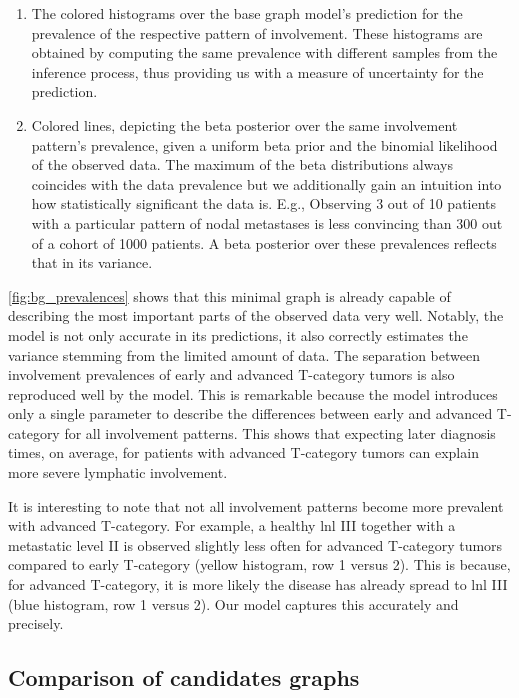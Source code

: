 \documentclass[twocolumn]{aastex631}
\begin{document}
\begin{enumerate}
    \item The colored histograms over the base graph model's prediction for the prevalence of the respective pattern of involvement. These histograms are obtained by computing the same prevalence with different samples from the inference process, thus providing us with a measure of uncertainty for the prediction.
    \item Colored lines, depicting the beta posterior over the same involvement pattern's prevalence, given a uniform beta prior and the binomial likelihood of the observed data. The maximum of the beta distributions always coincides with the data prevalence but we additionally gain an intuition into how statistically significant the data is. E.g., Observing 3 out of 10 patients with a particular pattern of nodal metastases is less convincing than 300 out of a cohort of 1000 patients. A beta posterior over these prevalences reflects that in its variance.
\end{enumerate}

\autoref{fig:bg_prevalences} shows that this minimal graph is already capable of describing the most important parts of the observed data very well. Notably, the model is not only accurate in its predictions, it also correctly estimates the variance stemming from the limited amount of data. The separation between involvement prevalences of early and advanced T-category tumors is also reproduced well by the model. This is remarkable because the model introduces only a single parameter to describe the differences between early and advanced T-category for all involvement patterns. This shows that expecting later diagnosis times, on average, for patients with advanced T-category tumors can explain more severe lymphatic involvement.

It is interesting to note that not all involvement patterns become more prevalent with advanced T-category. For example, a healthy \gls{lnl} III together with a metastatic level II is observed slightly less often for advanced T-category tumors compared to early T-category (yellow histogram, row 1 versus 2). This is because, for advanced T-category, it is more likely the disease has already spread to \gls{lnl} III (blue histogram, row 1 versus 2). Our model captures this accurately and precisely.


\subsection{Comparison of candidates graphs}
\label{subsec:results:graph_candidates}
\end{document}
